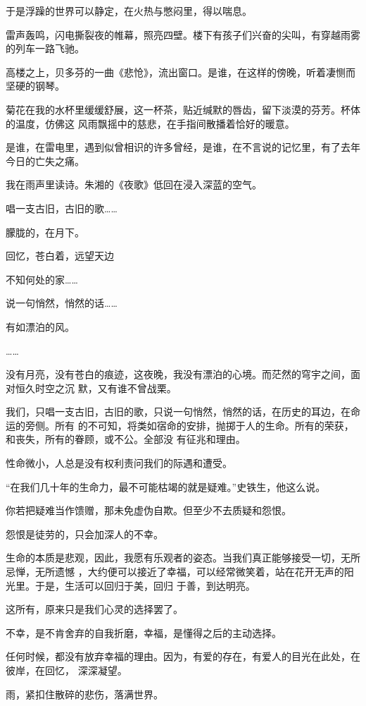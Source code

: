 \documentclass[12pt,a4paper]{article}
\begin{document}
		于是浮躁的世界可以静定，在火热与憋闷里，得以喘息。


		雷声轰鸣，闪电撕裂夜的帷幕，照亮四壁。楼下有孩子们兴奋的尖叫，有穿越雨雾的列车一路飞驰。


		高楼之上，贝多芬的一曲《悲怆》，流出窗口。是谁，在这样的傍晚，听着凄恻而坚硬的钢琴。


		菊花在我的水杯里缓缓舒展，这一杯茶，贴近缄默的唇齿，留下淡漠的芬芳。杯体的温度，仿佛这
	风雨飘摇中的慈悲，在手指间散播着恰好的暖意。


		是谁，在雷电里，遇到似曾相识的许多曾经，是谁，在不言说的记忆里，有了去年今日的亡失之痛。


		我在雨声里读诗。朱湘的《夜歌》低回在浸入深蓝的空气。


		\longpoem{}{}{}

		唱一支古旧，古旧的歌……

		朦胧的，在月下。

		回忆，苍白着，远望天边

		不知何处的家……

		说一句悄然，悄然的话……

		有如漂泊的风。

		……
		\endlongpoem


		没有月亮，没有苍白的痕迹，这夜晚，我没有漂泊的心境。而茫然的穹宇之间，面对恒久时空之沉
	默，又有谁不曾战栗。


		我们，只唱一支古旧，古旧的歌，只说一句悄然，悄然的话，在历史的耳边，在命运的旁侧。所有
	的不可知，将类如宿命的安排，抛掷于人的生命。所有的荣获，和丧失，所有的眷顾，或不公。全部没
	有征兆和理由。


		性命微小，人总是没有权利责问我们的际遇和遭受。


		“在我们几十年的生命力，最不可能枯竭的就是疑难。”史铁生，他这么说。


		你若把疑难当作馈赠，那未免虚伪自欺。但至少不去质疑和怨恨。

		怨恨是徒劳的，只会加深人的不幸。


		生命的本质是悲观，因此，我愿有乐观者的姿态。当我们真正能够接受一切，无所忌惮，无所遗憾
	，大约便可以接近了幸福，可以经常微笑着，站在花开无声的阳光里。于是，生活可以回归于美，回归
	于善，到达明亮。


		这所有，原来只是我们心灵的选择罢了。


		不幸，是不肯舍弃的自我折磨，幸福，是懂得之后的主动选择。


		任何时候，都没有放弃幸福的理由。因为，有爱的存在，有爱人的目光在此处，在彼岸，在回忆，
	深深凝望。


		雨，紧扣住散碎的悲伤，落满世界。
\end{document}
